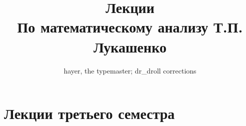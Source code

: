 \documentclass[10pt, oneside, a4paper]{book}
\theoremstyle{plain}%
\theoremstyle{definition}
\theoremstyle{remark}
\begin{document}
\begin{titlepage}
\author{hayer, the typemaster; dr\_droll corrections}
\title{Лекции\\ По математическому анализу Т.П. Лукашенко}
\maketitle
\end{titlepage}
\setcounter{part}{2}
\part{	Лекции третьего семестра}
\setcounter{chapter}{0}



\end{document}
